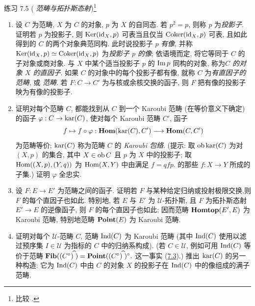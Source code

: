 \begin{enonce*}[remark]{练习 7.5}
(\emph{ 范畴\pageoriginale 与拓扑斯态射})\footnote[1]{比较 .}
\begin{enumerate}
\renewcommand{\theenumi}{\alph{enumi}}
\renewcommand{\labelenumi}{\theenumi)}
\item 设 $C$ 为范畴, $X$ 为 $C$ 的对象, $p$ 为 $X$ 的自同态. 若 $p^2=p$, 则称 $p$ 为\emph{投影子}. 证明若 $p$ 为投影子, 则 $\operatorname{Ker}(\operatorname{id}_X,p)$ 可表当且仅当 $\operatorname{Coker}(\operatorname{id}_X,p)$ 可表, 且如此得到的 $C$ 的两个对象典范同构. 此时说投影子 $p$ \emph{有像}, 并称 $\operatorname{Ker}(\operatorname{id}_X,p)\simeq \operatorname{Coker}(\operatorname{id}_X,p)$ 为\emph{投影子 $p$ 的像}; 依语境而定, 将它等同于 $C$ 的子对象或商对象. 与 $X$ 中某个适当投影子 $p$ 的 $\text{Im\,} p$ 同构的对象, 称为\emph{$C$ 的对象 $X$ 的直因子}. 如果 $C$ 的对象中的每个投影子都有像, 就称 $C$ 为\emph{有直因子的范畴}, 或 \emph{ 范畴}. 若 $F:C\rightarrow C'$ 为与核或余核交换的函子, 则 $F$ 把有像的投影子映为有像的投影子.

\item 证明对每个范畴 $C$, 都能找到从 $C$ 到一个 Karoubi 范畴 (在等价意义下确定) 的函子 $\varphi:C\rightarrow \operatorname{kar} (C)$, 使对每个 Karoubi 范畴 $C'$, 函子
$$
f\mapsto f\circ \varphi:\operatorname{\mathbf{Hom}}(\operatorname{kar}(C),C')\longrightarrow \operatorname{\mathbf{Hom}}(C,C')
$$
为范畴等价; $\operatorname{kar}(C)$ 称为范畴 $C$ 的 \emph{Karoubi 包络}. (提示: 取 $\operatorname{ob} \operatorname{kar} (C)$ 为对 $(X,p)$ 的集合, 其中 $X\in \operatorname{ob} C$ 且 $p$ 为 $X$ 中的投影子; 取 $\operatorname{Hom}((X,p),(Y,q))$ 为 $\operatorname{Hom}(X,Y)$ 中由满足 $f=qfp.$ 的那些 $f:X\rightarrow Y$ 所成的子集.) 证明 $\varphi$ 全忠实.

\item 设 $F:E\rightarrow E'$ 为范畴之间的函子. 证明若 $F$ 与某种给定归纳或投射极限交换,\pageoriginale 则 $F$ 的每个直因子也如此. 特别地, 若 $E$ 与 $E'$ 为 $𝒰$-拓扑斯, 且 $F$ 为拓扑斯态射 $E'\rightarrow E$ 的逆像函子, 则 $F$ 的每个直因子也如此; 因而范畴 $\operatorname{\mathbf{Homtop}}(E',E)$ 为 Karoubi 范畴, 特别地范畴 $\operatorname{\mathbf{Point}}(E)$ 为 Karoubi 范畴.

\item 证明对每个 $𝒰$-范畴 $C$, 范畴 $\operatorname{Ind}(C)$ 为 Karoubi 范畴 (其中 $\operatorname{Ind}(C)$ 使用以滤过预序集 $I\in 𝒰$ 为指标的 $C$ 中的归纳系构成). (若 $C\in 𝒰$, 例如可用 $\operatorname{Ind}(C)$ 等价于范畴 $\operatorname{\mathbf{Fib}}((C^{\circ})^{\widehat{\phantom{,}}})=\operatorname{\mathbf{Point}}((C^{\circ})^{\widehat{\phantom{,}}})^{\circ}.$ 这一事实 (\hyperref[IV.subsec7.3]{7.3}).) 推出 $\operatorname{kar}(C)$ 的另一种构造: 它为 $\operatorname{Ind}(C)$ 中由 $C$ 的对象 $X$ 的投影子在 $\operatorname{Ind}(C)$ 中的像组成的满子范畴.
\end{enumerate}
\end{enonce*}

